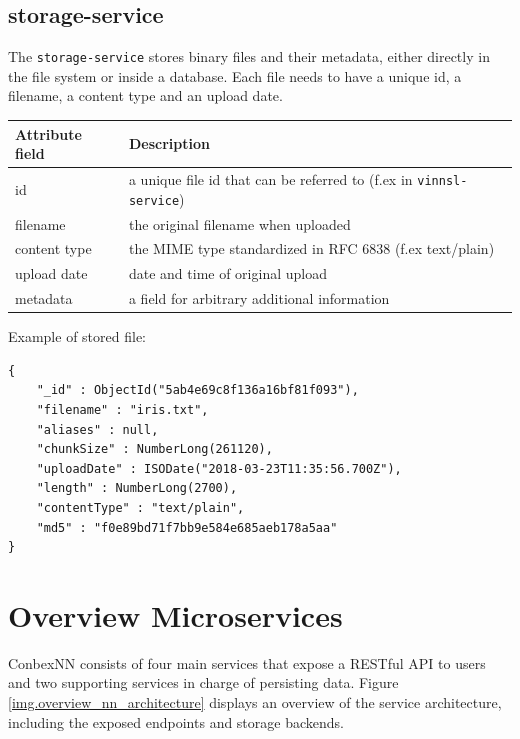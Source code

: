 \subsection{storage-service}\label{storage-service}

The \texttt{storage-service} stores binary files and their metadata,
either directly in the file system or inside a database. Each file needs
to have a unique id, a filename, a content type and an upload date.

\begin{longtable}[]{@{}ll@{}}
\toprule
Attribute field & Description\tabularnewline
\midrule
\endhead
id & a unique file id that can be referred to (f.ex in
\texttt{vinnsl-service})\tabularnewline
filename & the original filename when uploaded\tabularnewline
content type & the MIME type standardized in RFC 6838 (f.ex
text/plain)\tabularnewline
upload date & date and time of original upload\tabularnewline
metadata & a field for arbitrary additional information\tabularnewline
\bottomrule
\end{longtable}

Example of stored file:

\begin{verbatim}
{
    "_id" : ObjectId("5ab4e69c8f136a16bf81f093"),
    "filename" : "iris.txt",
    "aliases" : null,
    "chunkSize" : NumberLong(261120),
    "uploadDate" : ISODate("2018-03-23T11:35:56.700Z"),
    "length" : NumberLong(2700),
    "contentType" : "text/plain",
    "md5" : "f0e89bd71f7bb9e584e685aeb178a5aa"
}
\end{verbatim}

\section{Overview Microservices}\label{overview-microservices}

ConbexNN consists of four main services that expose a RESTful API to
users and two supporting services in charge of persisting data. Figure
\ref{img.overview_nn_architecture} displays an overview of the service
architecture, including the exposed endpoints and storage backends.

